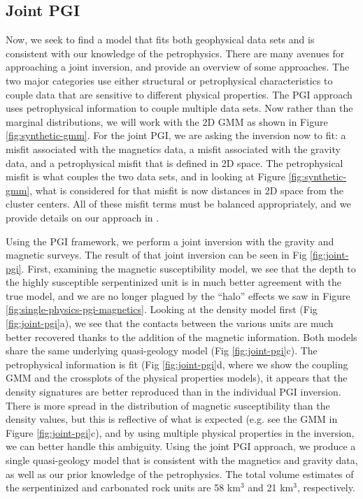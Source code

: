 \documentclass[
    paper,
  ]{geophysics}
\begin{document}
\subsection{Joint PGI}
Now, we seek to find a model that fits both geophysical data sets and is consistent with our knowledge of the petrophysics. There are many avenues for approaching a joint inversion, and \cite{Haber2013, Moorkamp2016} provide an overview of some approaches. The two major categories use either structural or petrophysical characteristics to couple data that are sensitive to different physical properties. The PGI approach uses petrophysical information to couple multiple data sets. Now rather than the marginal distributions, we will work with the 2D GMM as shown in Figure \ref{fig:synthetic-gmm}. For the joint PGI, we are asking the inversion now to fit: a misfit associated with the magnetics data, a misfit associated with the gravity data, and a petrophysical misfit that is defined in 2D space. The petrophysical misfit is what couples the two data sets, and in looking at Figure \ref{fig:synthetic-gmm}, what is considered for that misfit is now distances in 2D space from the cluster centers. All of these misfit terms must be balanced appropriately, and we provide details on our approach in \citep{Astic2020}.

Using the PGI framework, we perform a joint inversion with the gravity and magnetic surveys. The result of that joint inversion can be seen in Fig \ref{fig:joint-pgi}. First, examining the magnetic susceptibility model, we see that the depth to the highly susceptible serpentinized unit is in much better agreement with the true model, and we are no longer plagued by the ``halo'' effects we saw in Figure \ref{fig:single-physics-pgi-magnetics}. Looking at the density model first (Fig \ref{fig:joint-pgi}a), we see that the contacts between the various units are much better recovered thanks to the addition of the magnetic information. Both models share the same underlying quasi-geology model (Fig \ref{fig:joint-pgi}c). The petrophysical information is fit (Fig \ref{fig:joint-pgi}d, where we show the coupling GMM and the crossplots of the physical properties models), it appears that the density signatures are better reproduced than in the individual PGI inversion. There is more spread in the distribution of magnetic susceptibility than the density values, but this is reflective of what is expected (e.g. see the GMM in Figure \ref{fig:joint-pgi}c), and by using multiple physical properties in the inversion, we can better handle this ambiguity. Using the joint PGI approach, we produce a single quasi-geology model that is consistent with the magnetics and gravity data, as well as our prior knowledge of the petrophysics. The total volume estimates of the serpentinized and carbonated rock units are 58 km$^3$ and 21 km$^3$, respectively.
\end{document}

